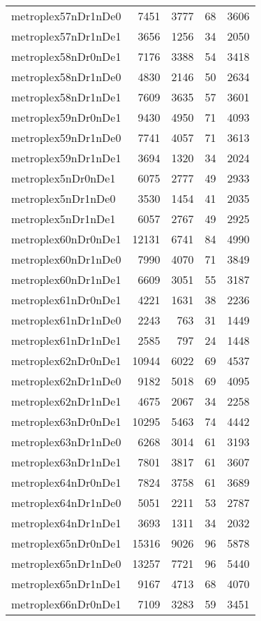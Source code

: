 \begin{longtable}{lrrrr}
metroplex57nDr1nDe0 & 7451 & 3777 & 68 & 3606 \\
metroplex57nDr1nDe1 & 3656 & 1256 & 34 & 2050 \\
metroplex58nDr0nDe1 & 7176 & 3388 & 54 & 3418 \\
metroplex58nDr1nDe0 & 4830 & 2146 & 50 & 2634 \\
metroplex58nDr1nDe1 & 7609 & 3635 & 57 & 3601 \\
metroplex59nDr0nDe1 & 9430 & 4950 & 71 & 4093 \\
metroplex59nDr1nDe0 & 7741 & 4057 & 71 & 3613 \\
metroplex59nDr1nDe1 & 3694 & 1320 & 34 & 2024 \\
metroplex5nDr0nDe1 & 6075 & 2777 & 49 & 2933 \\
metroplex5nDr1nDe0 & 3530 & 1454 & 41 & 2035 \\
metroplex5nDr1nDe1 & 6057 & 2767 & 49 & 2925 \\
metroplex60nDr0nDe1 & 12131 & 6741 & 84 & 4990 \\
metroplex60nDr1nDe0 & 7990 & 4070 & 71 & 3849 \\
metroplex60nDr1nDe1 & 6609 & 3051 & 55 & 3187 \\
metroplex61nDr0nDe1 & 4221 & 1631 & 38 & 2236 \\
metroplex61nDr1nDe0 & 2243 & 763 & 31 & 1449 \\
metroplex61nDr1nDe1 & 2585 & 797 & 24 & 1448 \\
metroplex62nDr0nDe1 & 10944 & 6022 & 69 & 4537 \\
metroplex62nDr1nDe0 & 9182 & 5018 & 69 & 4095 \\
metroplex62nDr1nDe1 & 4675 & 2067 & 34 & 2258 \\
metroplex63nDr0nDe1 & 10295 & 5463 & 74 & 4442 \\
metroplex63nDr1nDe0 & 6268 & 3014 & 61 & 3193 \\
metroplex63nDr1nDe1 & 7801 & 3817 & 61 & 3607 \\
metroplex64nDr0nDe1 & 7824 & 3758 & 61 & 3689 \\
metroplex64nDr1nDe0 & 5051 & 2211 & 53 & 2787 \\
metroplex64nDr1nDe1 & 3693 & 1311 & 34 & 2032 \\
metroplex65nDr0nDe1 & 15316 & 9026 & 96 & 5878 \\
metroplex65nDr1nDe0 & 13257 & 7721 & 96 & 5440 \\
metroplex65nDr1nDe1 & 9167 & 4713 & 68 & 4070 \\
metroplex66nDr0nDe1 & 7109 & 3283 & 59 & 3451 \\

\end{longtable}
